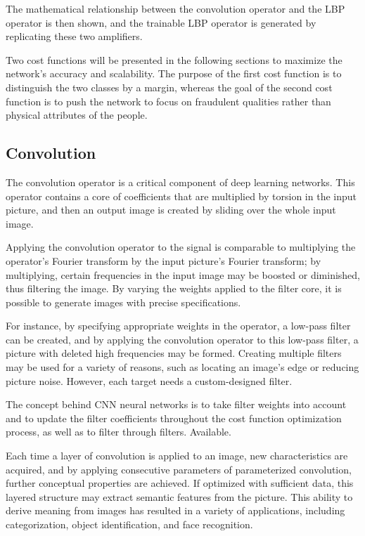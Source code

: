 \documentclass[journal]{IEEEtran}
\begin{document}
The mathematical relationship between the convolution operator and the LBP operator is then shown, and the trainable LBP operator is generated by replicating these two amplifiers.

Two cost functions will be presented in the following sections to maximize the network's accuracy and scalability. The purpose of the first cost function is to distinguish the two classes by a margin, whereas the goal of the second cost function is to push the network to focus on fraudulent qualities rather than physical attributes of the people.

\subsection{Convolution}
The convolution operator is a critical component of deep learning networks. This operator contains a core of coefficients that are multiplied by torsion in the input picture, and then an output image is created by sliding over the whole input image.

Applying the convolution operator to the signal is comparable to multiplying the operator's Fourier transform by the input picture's Fourier transform; by multiplying, certain frequencies in the input image may be boosted or diminished, thus filtering the image. By varying the weights applied to the filter core, it is possible to generate images with precise specifications.

For instance, by specifying appropriate weights in the operator, a low-pass filter can be created, and by applying the convolution operator to this low-pass filter, a picture with deleted high frequencies may be formed. Creating multiple filters may be used for a variety of reasons, such as locating an image's edge or reducing picture noise. However, each target needs a custom-designed filter.

The concept behind CNN neural networks is to take filter weights into account and to update the filter coefficients throughout the cost function optimization process, as well as to filter through filters. Available.

Each time a layer of convolution is applied to an image, new characteristics are acquired, and by applying consecutive parameters of parameterized convolution, further conceptual properties are achieved. If optimized with sufficient data, this layered structure may extract semantic features from the picture. This ability to derive meaning from images has resulted in a variety of applications, including categorization, object identification, and face recognition.
\end{document}
